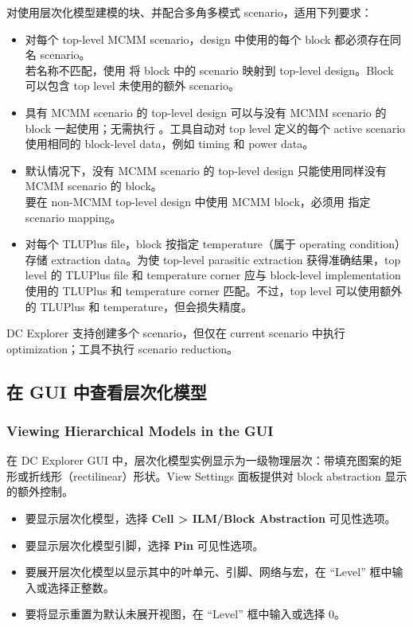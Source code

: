 对使用层次化模型建模的块、并配合多角多模式 scenario，适用下列要求：
\begin{itemize}
  \item 对每个 top-level MCMM scenario，design 中使用的每个 block 都必须存在同名 scenario。\\
        若名称不匹配，使用  将 block 中的 scenario 映射到 top-level design。Block 可以包含 top level 未使用的额外 scenario。
  \item 具有 MCMM scenario 的 top-level design 可以与没有 MCMM scenario 的 block 一起使用；无需执行 。工具自动对 top level 定义的每个 active scenario 使用相同的 block-level data，例如 timing 和 power data。
  \item 默认情况下，没有 MCMM scenario 的 top-level design 只能使用同样没有 MCMM scenario 的 block。\\
        要在 non-MCMM top-level design 中使用 MCMM block，必须用  指定 scenario mapping。
  \item 对每个 TLUPlus file，block 按指定 temperature（属于 operating condition）存储 extraction data。为使 top-level parasitic extraction 获得准确结果，top level 的 TLUPlus file 和 temperature corner 应与 block-level implementation 使用的 TLUPlus 和 temperature corner 匹配。不过，top level 可以使用额外的 TLUPlus 和 temperature，但会损失精度。
\end{itemize}

\begin{noteBox}
DC Explorer 支持创建多个 scenario，但仅在 current scenario 中执行 optimization；工具不执行 scenario reduction。
\end{noteBox}

\subsection{在 GUI 中查看层次化模型}
\subsubsection*{Viewing Hierarchical Models in the GUI}

在 DC Explorer GUI 中，层次化模型实例显示为一级物理层次：带填充图案的矩形或折线形（rectilinear）形状。View Settings 面板提供对 block abstraction 显示的额外控制。
\begin{itemize}
  \item 要显示层次化模型，选择 \textbf{Cell > ILM/Block Abstraction} 可见性选项。
  \item 要显示层次化模型引脚，选择 \textbf{Pin} 可见性选项。
  \item 要展开层次化模型以显示其中的叶单元、引脚、网络与宏，在 ``Level'' 框中输入或选择正整数。
  \item 要将显示重置为默认未展开视图，在 ``Level'' 框中输入或选择 0。
\end{itemize}

